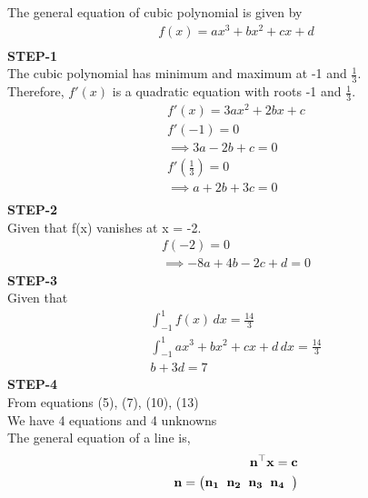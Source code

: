 \documentclass[10pt,a4paper]{report}
\newcommand{\myvec}[1]{\ensuremath{\begin{pmatrix}#1\end{pmatrix}}}
\let\vec\mathbf
\let\vec\mathbf
\begin{document}
\begin{multicols}{2}
\vspace{1mm}
The general equation of cubic polynomial is given by\\
\begin{align}
f(x) = ax^3 + bx^2 + cx + d\\
\end{align}
\textbf{STEP-1}\vspace{2mm}\\
The cubic polynomial has minimum and maximum at -1 and $\frac{1}{3}$.  \\
Therefore, $f'(x)$ is a quadratic equation with roots -1 and $\frac{1}{3}$.\\
\begin{align}
f'(x) = 3ax^2 + 2bx + c\\
f'(-1) = 0\\
\implies 3a - 2b + c = 0\\
f'(\frac{1}{3}) = 0\\ 
\implies a + 2b + 3c = 0\\
\end{align}
\textbf{STEP-2}\vspace{2mm}\\
Given that f(x) vanishes at x = -2. \\ \vspace{1mm}
\begin{align}
  f(-2) = 0\\
  \implies -8a + 4b - 2c + d = 0 
\end{align}
\textbf{STEP-3}\vspace{2mm}\\
Given that \\ \vspace{1mm}
\begin{align}
\int_{-1}^{1}f(x) \,dx = \frac{14}{3}\\
\int_{-1}^{1}ax^3 + bx^2 + cx + d \,dx = \frac{14}{3}\\
b + 3d = 7
\end{align}
\textbf{STEP-4}\vspace{2mm}\\
From equations (5), (7), (10), (13)\\
We have 4 equations and 4 unknowns\\
The general equation of a line is,\\
\begin{align}
\vec{n}^\top \vec{x} = \vec{c}\\
\vec{n} = \myvec{\vec{n_1}\hspace{2mm}\vec{n_2}\hspace{2mm}\vec{n_3}\hspace{2mm}\vec{n_4}\hspace{2mm}}

\end{align}
\end{multicols}
\end{document}
